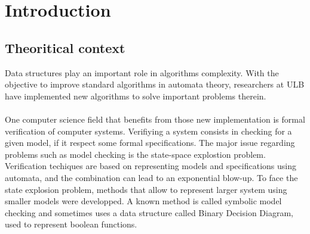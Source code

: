 \documentclass[11pt,a4paper]{article}
\theoremstyle{definition}
\begin{document}
%



\newpage

\tableofcontents

\newpage


\newpage

\section{Introduction}

\subsection{Theoritical context}

Data structures play an important role in algorithms complexity.
With the objective to improve standard algorithms in automata theory,
researchers at ULB
have implemented new algorithms to solve
important problems therein.

\paragraph{}

One computer science
field that benefits from
those new implementation is formal verification of computer systems.
Verifiying a system consists in checking for a given model, if
it respect some formal specifications.
The major issue regarding problems
such as model checking is the state-space explostion problem.
Verification techiques are based on representing
models and specifications using automata, and the combination
can lead to an exponential blow-up. To face the state explosion
problem, methods that allow to represent larger system using
smaller models were developped. A known method is called
symbolic model checking and sometimes uses a data structure called
Binary Decision Diagram, used to represent boolean functions.

\paragraph{}
\end{document}
